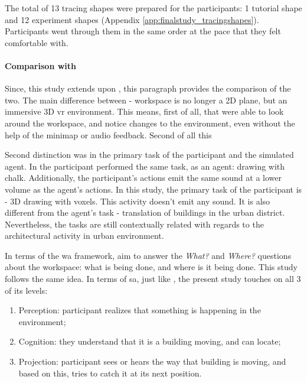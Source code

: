 The total of 13 tracing shapes were prepared for the participants: 1 tutorial shape and 12 experiment shapes (Appendix \ref{app:finalstudy_tracingshapes}).
Participants went through them in the same order at the pace that they felt comfortable with.

\paragraph{Comparison with }
Since, this study extends upon \parencite{gutwin_chalk_2011}, this paragraph provides the comparison of the two.
The main difference between - workspace is no longer a 2D plane, but an immersive 3D \gls{vr} environment. This means, first of all, that were able to look around the workspace, and notice changes to the environment, even without the help of the minimap or audio feedback. 
Second of all this 

Second distinction was in the primary task of the participant and the simulated agent. In \parencite{gutwin_chalk_2011} the participant performed the same task, as an agent: drawing with chalk. Additionally, the participant's actions emit the same sound at a lower volume as the agent's actions. In this study, the primary task of the participant is - 3D drawing with voxels. This activity doesn't emit any sound. It is also different from the agent's task - translation of buildings in the urban district. Nevertheless, the tasks are still contextually related with regards to the architectural activity in urban environment.

In terms of the \gls{wa} framework, \parencite{gutwin_chalk_2011} aim to answer the \textit{What?} and \textit{Where?} questions about the workspace: what is being done, and where is it being done. This study follows the same idea. In terms of \gls{sa}, just like \parencite{gutwin_chalk_2011}, the present study touches on all 3 of its levels: 
\begin{enumerate}
	\item Perception: participant realizes that something is happening in the environment;
	\item Cognition: they understand that it is a building moving, and can locate;
	\item Projection: participant sees or hears the way that building is moving, and based on this, tries to catch it at its next position.
\end{enumerate}

